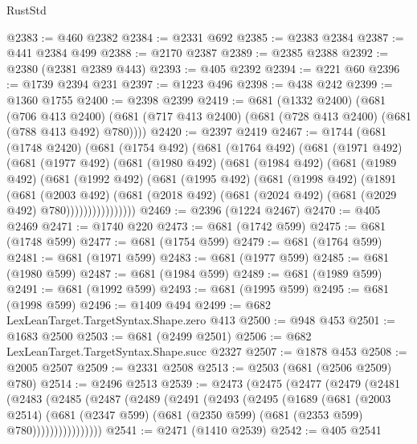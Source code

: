 \begin{lexlean}{RustStd}
\begin{coremodule}
{\begin{coremodule}
{{{{{{{{{{{{{{{{{{{{{{{{{{@2383 := @460 @2382
@2384 := @2331 @692
@2385 := @2383 @2384
@2387 := @441 @2384 @499
@2388 := @2170 @2387
@2389 := @2385 @2388
@2392 := @2380 (@2381 @2389 @443)
@2393 := @405 @2392
@2394 := @221 @60
@2396 := @1739 @2394 @231
@2397 := @1223 @496
@2398 := @438 @242
@2399 := @1360 @1755
@2400 := @2398 @2399
@2419 := @681
    (@1332 @2400)
    (@681
      (@706 @413 @2400)
      (@681 (@717 @413 @2400) (@681 (@728 @413 @2400) (@681 (@788 @413 @492) @780))))
@2420 := @2397 @2419
@2467 := @1744
    (@681
      (@1748 @2420)
      (@681
        (@1754 @492)
        (@681
          (@1764 @492)
          (@681
            (@1971 @492)
            (@681
              (@1977 @492)
              (@681
                (@1980 @492)
                (@681
                  (@1984 @492)
                  (@681
                    (@1989 @492)
                    (@681
                      (@1992 @492)
                      (@681
                        (@1995 @492)
                        (@681
                          (@1998 @492)
                          (@1891
                            (@681
                              (@2003 @492)
                              (@681
                                (@2018 @492)
                                (@681 (@2024 @492) (@681 (@2029 @492) @780))))))))))))))))
@2469 := @2396 (@1224 @2467)
@2470 := @405 @2469
@2471 := @1740 @220
@2473 := @681 (@1742 @599)
@2475 := @681 (@1748 @599)
@2477 := @681 (@1754 @599)
@2479 := @681 (@1764 @599)
@2481 := @681 (@1971 @599)
@2483 := @681 (@1977 @599)
@2485 := @681 (@1980 @599)
@2487 := @681 (@1984 @599)
@2489 := @681 (@1989 @599)
@2491 := @681 (@1992 @599)
@2493 := @681 (@1995 @599)
@2495 := @681 (@1998 @599)
@2496 := @1409 @494
@2499 := @682 LexLeanTarget.TargetSyntax.Shape.zero @413
@2500 := @948 @453
@2501 := @1683 @2500
@2503 := @681 (@2499 @2501)
@2506 := @682 LexLeanTarget.TargetSyntax.Shape.succ @2327
@2507 := @1878 @453
@2508 := @2005 @2507
@2509 := @2331 @2508
@2513 := @2503 (@681 (@2506 @2509) @780)
@2514 := @2496 @2513
@2539 := @2473
    (@2475
      (@2477
        (@2479
          (@2481
            (@2483
              (@2485
                (@2487
                  (@2489
                    (@2491
                      (@2493
                        (@2495
                          (@1689
                            (@681
                              (@2003 @2514)
                              (@681
                                (@2347 @599)
                                (@681 (@2350 @599) (@681 (@2353 @599) @780))))))))))))))))
@2541 := @2471 (@1410 @2539)
@2542 := @405 @2541
}}}}}}}}}}}}}}}}}}}}}}}}}}
\end{coremodule}}
\end{coremodule}
\end{lexlean}
